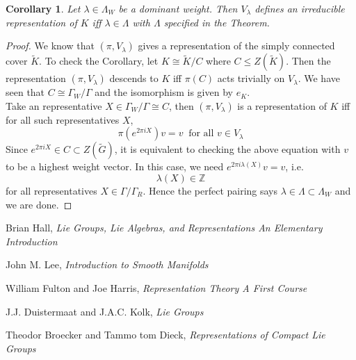 \documentclass[11pt]{article}
\newtheorem{corollary}[theorem]{Corollary}
\newcommand{\bb}[1]{\mathbb{#1}}
\begin{document}
\begin{corollary}
Let $\lambda \in \Lambda_W$ be a dominant weight. Then $V_{\lambda}$ defines an irreducible representation of $K$ iff $\lambda \in \Lambda$ with $\Lambda$ specified in the Theorem.
\end{corollary}
\begin{proof}
We know that $(\pi,V_{\lambda})$ gives a representation of the simply connected cover $\tilde{K}$. To check the Corollary, let $K \cong \tilde{K}/C$ where $C \leq Z(\tilde{K})$. Then the representation $(\pi,V_{\lambda})$ descends to $K$ iff $\pi(C)$ acts trivially on $V_{\lambda}$. We have seen that $C \cong \Gamma_W/\Gamma$ and the isomorphism is given by $e_K$.\\
Take an representative $X \in \Gamma_W/\Gamma \cong C$, then $(\pi,V_{\lambda})$ is a representation of $K$ iff for all such representatives $X$,
$$\pi(e^{2\pi i X})v = v\ \text{ for all } v \in V_{\lambda}$$
Since $e^{2\pi i X} \in C \subset Z(\tilde{G})$, it is equivalent to checking the above equation with $v$ to be a highest weight vector. In this case, we need $e^{2\pi i \lambda(X)}v = v$, i.e.
$$ \lambda(X) \in \bb{Z}$$
for all representatives $X \in \Gamma/\Gamma_R$. Hence the perfect pairing says $\lambda \in \Lambda \subset \Lambda_W$ and we are done.
\end{proof}


\begin{thebibliography}{30}

Brian Hall,
\emph{Lie Groups, Lie Algebras, and Representations An Elementary Introduction}

John M. Lee,
\emph{Introduction to Smooth Manifolds}

William Fulton and Joe Harris,
\emph{Representation Theory A First Course}

J.J. Duistermaat and J.A.C. Kolk,
\emph{Lie Groups}

Theodor Broecker and Tammo tom Dieck,
\emph{Representations of Compact Lie Groups}


\end{thebibliography}
\end{document}

